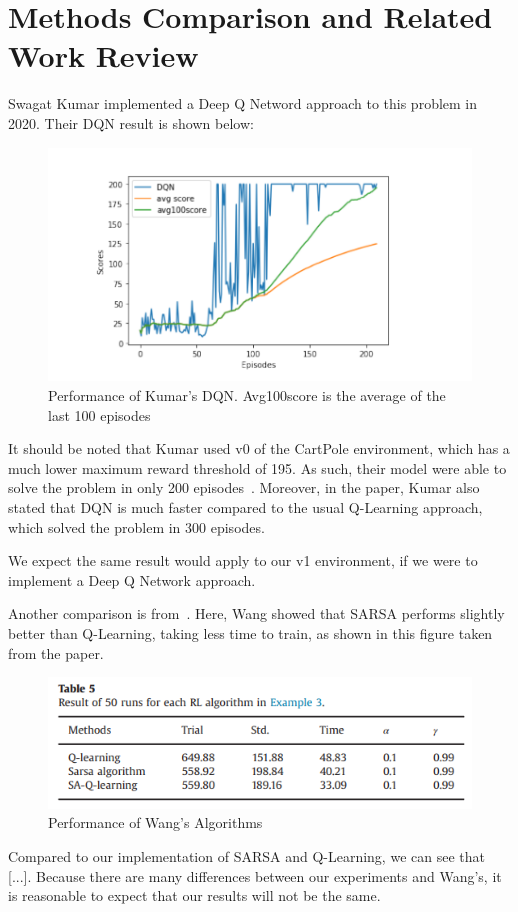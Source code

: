 \section{Methods Comparison and Related Work Review}

Swagat Kumar implemented a Deep Q Netword approach to this problem in 2020.
Their DQN result is shown below:

\begin{figure}[H] %
    \centering
    \includegraphics[width=0.75\linewidth]{kumar-2020-dqn.png}
    \caption{Performance of Kumar's DQN. Avg100score is the average of the last 100 episodes}
\end{figure}

It should be noted that Kumar used v0 of the CartPole environment, which has a much lower maximum reward threshold of 195. As such,
their model were able to solve the problem in only 200 episodes~\citep{kumar2020balancing}. Moreover, in the paper, Kumar also stated that
DQN is much faster compared to the usual Q-Learning approach, which solved the problem in 300 episodes.

We expect the same result would apply to our v1 environment, if we were to implement a Deep Q Network approach.

Another comparison is from~\citep{wang2013backward}. Here, Wang showed that SARSA performs slightly better than Q-Learning, taking less time to train, as shown
in this figure taken from the paper.

\begin{figure}[H] %
    \centering
    \includegraphics[width=0.75\linewidth]{wang-table.png}
    \caption{Performance of Wang's Algorithms}
\end{figure}

Compared to our implementation of SARSA and Q-Learning, we can see that [...]. Because there are many differences between our
experiments and Wang's, it is reasonable to expect that our results will not be the same.